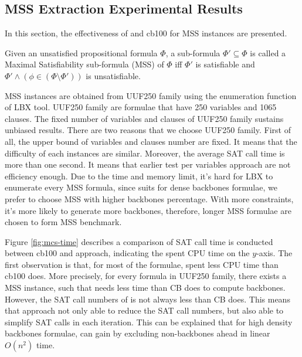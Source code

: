 

\subsection{MSS Extraction Experimental Results}
In this section, the effectiveness of \tool and cb100 for MSS instances are presented.
\begin{definition}
Given an unsatisfied propositional formula $\Phi$, a sub-formula $\Phi'\subseteq\Phi$ is called a Maximal Satisfiability sub-formula (MSS) of $\Phi$ iff $\Phi'$ is satisfiable and $\Phi'\wedge(\phi\in(\Phi\setminus\Phi'))$ is unsatisfiable.
\end{definition}

MSS instances are obtained from UUF250 family using the enumeration function of LBX\cite{MPA2015} tool. UUF250 family are formulae that have 250 variables and 1065 clauses. The fixed number of variables and clauses of UUF250 family sustains unbiased results.
There are two reasons that we choose UUF250 family. First of all, the upper bound of variables and clauses number are fixed. It means that the difficulty of each instances are similar. Moreover, the average SAT call time is more than one second. It means that earlier test per variables approach are not efficiency enough.
Due to the time and memory limit, it's hard for LBX to enumerate every MSS formula, since \tool suits for dense backbones formulae, we prefer to choose MSS with higher backbones percentage. With more constraints, it's more likely to generate more backbones, therefore, longer MSS formulae are chosen to form MSS benchmark.

Figure \ref{fig:mcs-time} describes a comparison of SAT call time is conducted between cb100 and \tool approach, indicating the spent CPU time on the $y$-axis. The first observation is that, for most of the formulae, \tool spent less CPU time than cb100 does. More precisely, for every formula in UUF250 family, there exists a MSS instance, such that \tool needs less time than CB does to compute backbones. However, the SAT call numbers of \tool is not always less than CB does. This means that \tool approach not only able to reduce the SAT call numbers, but also able to simplify SAT calls in each iteration. This can be explained that for high density backbones formulae, \tool can gain by excluding non-backbones ahead in linear $O(n^2)$ time.

